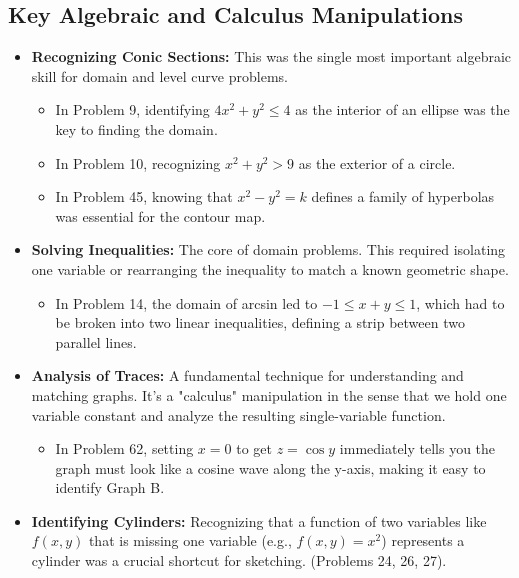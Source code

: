 \documentclass{article}
\begin{document}
\subsection{Key Algebraic and Calculus Manipulations}
\begin{itemize}
    \item \textbf{Recognizing Conic Sections:} This was the single most important algebraic skill for domain and level curve problems.
    \begin{itemize}
        \item In Problem 9, identifying $4x^2 + y^2 \le 4$ as the interior of an ellipse was the key to finding the domain.
        \item In Problem 10, recognizing $x^2 + y^2 > 9$ as the exterior of a circle.
        \item In Problem 45, knowing that $x^2 - y^2 = k$ defines a family of hyperbolas was essential for the contour map.
    \end{itemize}

    \item \textbf{Solving Inequalities:} The core of domain problems. This required isolating one variable or rearranging the inequality to match a known geometric shape.
    \begin{itemize}
        \item In Problem 14, the domain of arcsin led to $-1 \le x+y \le 1$, which had to be broken into two linear inequalities, defining a strip between two parallel lines.
    \end{itemize}

    \item \textbf{Analysis of Traces:} A fundamental technique for understanding and matching graphs. It's a "calculus" manipulation in the sense that we hold one variable constant and analyze the resulting single-variable function.
    \begin{itemize}
        \item In Problem 62, setting $x=0$ to get $z = \cos y$ immediately tells you the graph must look like a cosine wave along the y-axis, making it easy to identify Graph B.
    \end{itemize}
    
    \item \textbf{Identifying Cylinders:} Recognizing that a function of two variables like $f(x, y)$ that is missing one variable (e.g., $f(x, y) = x^2$) represents a cylinder was a crucial shortcut for sketching. (Problems 24, 26, 27).
\end{itemize}
\end{document}
